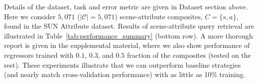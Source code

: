 \documentclass[runningheads]{llncs}
\begin{document}
Details of the dataset, task and error metric are given in Dataset section above. Here we consider $5,071$ ($|\mathcal{C}| = 5,071$) scene-attribute composites, $C = \{s,a\}$, found in the SUN Attribute dataset. 
Results of scene-attribute query retrieval are illustrated in Table~\ref{tab:performance_summary} (bottom row). A more thorough report is given in the supplemental material, where
we also show performance of regressors trained with $0.1$, $0.3$, and $0.5$ fraction of the composites (tested on the rest). These experiments illustrate that we can outperform baseline strategies (and nearly match cross-validation performance) with as little as 10\% training.

\end{document}
